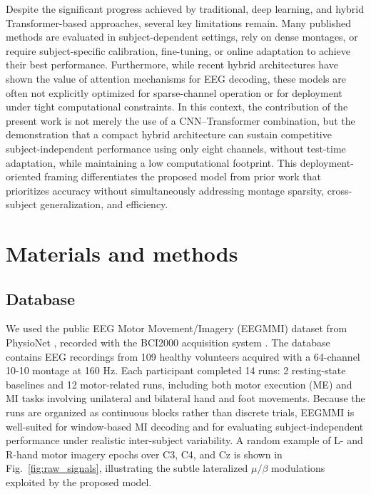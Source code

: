 \documentclass[a4paper,fleqn]{cas-dc}
\begin{document}
Despite the significant progress achieved by traditional, deep learning, and hybrid Transformer-based approaches, several key limitations remain. Many published methods are evaluated in subject-dependent settings, rely on dense montages, or require subject-specific calibration, fine-tuning, or online adaptation to achieve their best performance. Furthermore, while recent hybrid architectures have shown the value of attention mechanisms for EEG decoding, these models are often not explicitly optimized for sparse-channel operation or for deployment under tight computational constraints. In this context, the contribution of the present work is not merely the use of a CNN–Transformer combination, but the demonstration that a compact hybrid architecture can sustain competitive subject-independent performance using only eight channels, without test-time adaptation, while maintaining a low computational footprint. This deployment-oriented framing differentiates the proposed model from prior work that prioritizes accuracy without simultaneously addressing montage sparsity, cross-subject generalization, and efficiency.


\section{Materials and methods}

\subsection{Database}
We used the public EEG Motor Movement/Imagery (EEGMMI) dataset from PhysioNet \citep{5physionet2009eeg}, recorded with the BCI2000 acquisition system \citep{3schalk2004bci2000}. The database contains EEG recordings from 109 healthy volunteers acquired with a 64-channel 10-10 montage at 160 Hz. Each participant completed 14 runs: 2 resting-state baselines and 12 motor-related runs, including both motor execution (ME) and MI tasks involving unilateral and bilateral hand and foot movements. Because the runs are organized as continuous blocks rather than discrete trials, EEGMMI is well-suited for window-based MI decoding and for evaluating subject-independent performance under realistic inter-subject variability. A random example of L- and R-hand motor imagery epochs over C3, C4, and Cz is shown in Fig.~\ref{fig:raw_signals}, illustrating the subtle lateralized $\mu/\beta$ modulations exploited by the proposed model. 
\end{document}
